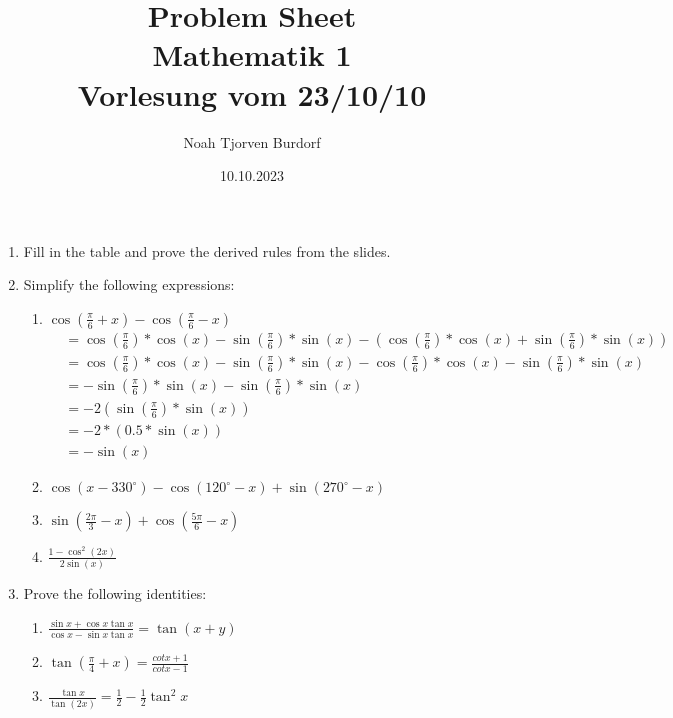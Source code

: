 \documentclass[a4paper,onecolumn,draft,pdftex]{report}
\begin{document}
    \author{Noah Tjorven Burdorf}
    \title{Problem Sheet \\ Mathematik 1 \\ Vorlesung vom 23/10/10}
    \date{10.10.2023}
    \maketitle


    \begin{enumerate}
        \item Fill in the table and prove the derived rules from the slides.
        \item Simplify the following expressions:
            \begin{enumerate}
                \item $\cos(\frac{\pi}{6}+x)-\cos(\frac{\pi}{6}-x)$
                \begin{align*}
                    &= \cos(\frac{\pi}{6})*\cos(x)-\sin(\frac{\pi}{6})*\sin(x)-(\cos(\frac{\pi}{6})*\cos(x)+\sin(\frac{\pi}{6})*\sin(x)) \\
                    &= \cos(\frac{\pi}{6})*\cos(x)-\sin(\frac{\pi}{6})*\sin(x)-\cos(\frac{\pi}{6})*\cos(x)-\sin(\frac{\pi}{6})*\sin(x) \\
                    &= -\sin(\frac{\pi}{6})*\sin(x)-\sin(\frac{\pi}{6})*\sin(x) \\
                    &= -2(\sin(\frac{\pi}{6})*\sin(x)) \\
                    &= -2*(0.5*\sin(x)) \\
                    &= -\sin(x)
                \end{align*}
                \item $\cos(x-330^\circ)-\cos(120^\circ-x)+\sin(270^\circ-x)$
                \item $\sin(\frac{2\pi}{3}-x)+\cos(\frac{5\pi}{6}-x)$
                \item $\frac{1-\cos^2(2x)}{2\sin(x)}$
            \end{enumerate}
        \item Prove the following identities:
            \begin{enumerate}
                \item $\frac{\sin x+\cos x\tan x}{\cos x-\sin x\tan x} = \tan(x+y)$
                \item $\tan(\frac{\pi}{4}+x)=\frac{cot x+1}{cot x-1}$
                \item $\frac{\tan x}{\tan(2x)}=\frac{1}{2}-\frac{1}{2}\tan^2 x$

\end{enumerate}
\end{enumerate}
\end{document}
